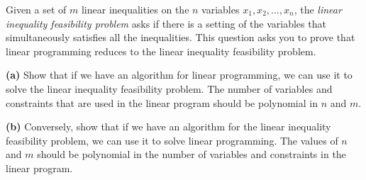 \documentclass[fleqn]{homework}
\begin{document}
  \begin{problem}{6}
    \begin{question}
      Given a set of $m$ linear inequalities on the $n$ variables
      $x_1, x_2, \dots, x_n$, the \textit{linear inequality feasibility problem}
      asks if there is a setting of the variables that simultaneously satisfies
      all the inequalities. This question asks you to prove that linear
      programming reduces to the linear inequality feasibility problem.

      \textbf{(a)} Show that if we have an algorithm for linear programming, we
      can use it to solve the linear inequality feasibility problem. The number
      of variables and constraints that are used in the linear program should be
      polynomial in $n$ and $m$.

      \textbf{(b)} Conversely, show that if we have an algorithm for the linear
      inequality feasibility problem, we can use it to solve linear
      programming. The values of $n$ and $m$ should be polynomial in the number
      of variables and constraints in the linear program.
    \end{question}
  \end{problem}
\end{document}
